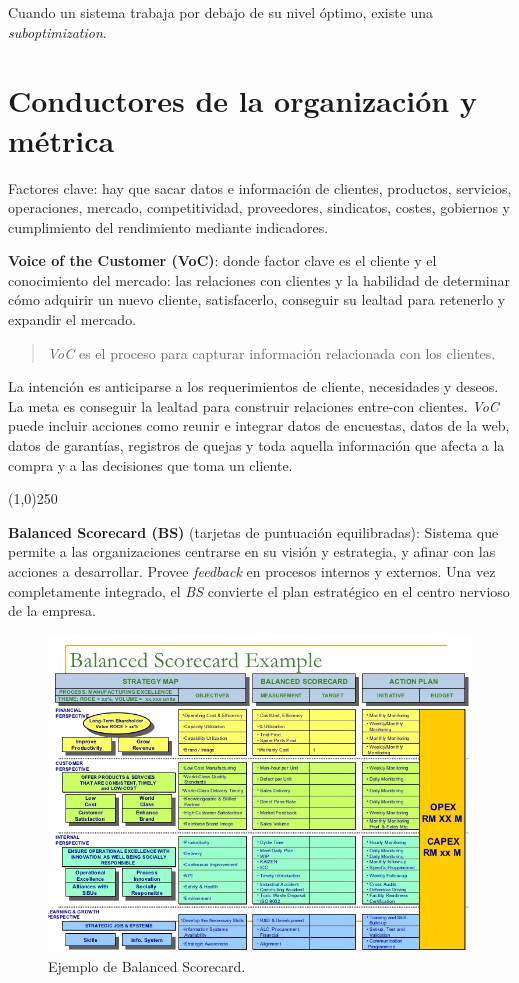 \documentclass[oneside]{book}
\begin{document}
Cuando un sistema trabaja por debajo de su nivel óptimo, existe una \textit{suboptimization}.

\section{Conductores de la organización y métrica}
Factores clave: hay que sacar datos e información de clientes, productos, servicios, operaciones, mercado, competitividad, proveedores, sindicatos, costes, gobiernos y cumplimiento del rendimiento mediante indicadores.

\textbf{Voice of the Customer (VoC)}: donde factor clave es el cliente y el conocimiento del mercado: las relaciones con clientes y la habilidad de determinar cómo adquirir un nuevo cliente, satisfacerlo, conseguir su lealtad para retenerlo y expandir el mercado. 
\begin{quote} \textit{VoC} es el proceso para capturar información relacionada con los clientes. \end{quote} 
		La intención es anticiparse a los requerimientos de cliente, necesidades y deseos. La meta es conseguir la lealtad para construir relaciones entre-con clientes. \textit{VoC} puede incluir acciones como reunir e integrar datos de encuestas, datos de la web, datos de garantías, registros de quejas y toda aquella información que afecta a la compra y a las decisiones que toma un cliente.

\begin{center}
	\line(1,0){250}
\end{center}

\textbf{Balanced Scorecard (BS)} (tarjetas de puntuación equilibradas): Sistema que permite a las organizaciones centrarse en su visión y estrategia, y afinar con las acciones a desarrollar. Provee \textit{feedback} en procesos internos y externos. Una vez completamente integrado, el \textit{BS} convierte el plan estratégico en el centro nervioso de la empresa.

\begin{figure}[ht!]
	\centering
	\includegraphics[width=140mm]{imagenes/BS.jpg}
	\caption{Ejemplo de Balanced Scorecard.}
	\label{fig:Balanced ScoreCard}
\end{figure}
\end{document}
